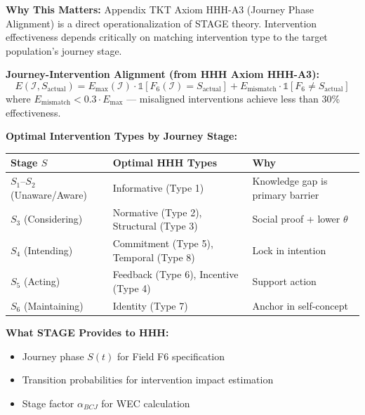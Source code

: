 \begin{tcolorbox}[colback=orange!5!white, colframe=orange!75!black,
    title=\textbf{Integration: STAGE $\leftrightarrow$ HHH (Intervention Toolkit)}]

\textbf{Why This Matters:}
Appendix TKT Axiom HHH-A3 (Journey Phase Alignment) is a direct operationalization
of STAGE theory. Intervention effectiveness depends critically on matching
intervention type to the target population's journey stage.

\textbf{Journey-Intervention Alignment (from HHH Axiom HHH-A3):}
\begin{equation}
E(\mathcal{I}, S_{\text{actual}}) = E_{\max}(\mathcal{I}) \cdot \mathbb{1}[F_6(\mathcal{I}) = S_{\text{actual}}] + E_{\text{mismatch}} \cdot \mathbb{1}[F_6 \neq S_{\text{actual}}]
\end{equation}
where $E_{\text{mismatch}} < 0.3 \cdot E_{\max}$ --- misaligned interventions achieve less than 30\% effectiveness.

\textbf{Optimal Intervention Types by Journey Stage:}
\begin{center}
\renewcommand{\arraystretch}{1.2}
\begin{tabular}{@{}lll@{}}
\toprule
\textbf{Stage $S$} & \textbf{Optimal HHH Types} & \textbf{Why} \\
\midrule
$S_1$--$S_2$ (Unaware/Aware) & Informative (Type 1) & Knowledge gap is primary barrier \\
$S_3$ (Considering) & Normative (Type 2), Structural (Type 3) & Social proof + lower $\theta$ \\
$S_4$ (Intending) & Commitment (Type 5), Temporal (Type 8) & Lock in intention \\
$S_5$ (Acting) & Feedback (Type 6), Incentive (Type 4) & Support action \\
$S_6$ (Maintaining) & Identity (Type 7) & Anchor in self-concept \\
\bottomrule
\end{tabular}
\end{center}

\textbf{What STAGE Provides to HHH:}
\begin{itemize}[nosep]
\item Journey phase $S(t)$ for Field F6 specification
\item Transition probabilities for intervention impact estimation
\item Stage factor $\alpha_{BCJ}$ for WEC calculation
\end{itemize}


\end{tcolorbox}
